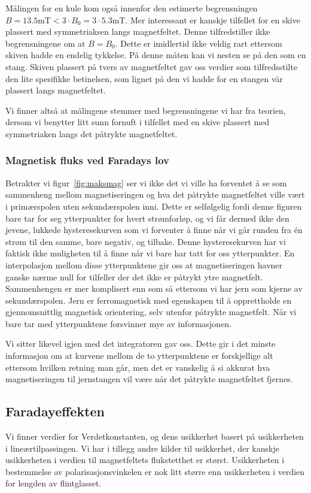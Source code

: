 \documentclass[a4paper,11pt, twocolumn]{article}
\begin{document}
Målingen for en kule kom også innenfor den estimerte begrensningen $B=13.5\text{mT}<3\cdot B_0=3\cdot 5.3$mT. Mer interessant er kanskje tilfellet for en skive plassert med symmetriaksen langs magnetfeltet. Denne tilfredstiller ikke begrensningene om at $B=B_0$. Dette er imidlertid ikke veldig rart ettersom skiven hadde en endelig tykkelse. På denne måten kan vi nesten se på den som en stang. Skiven plassert på tvers av magnetfeltet gav oss verdier som tilfredsstilte den lite spesifikke betinelsen, som lignet på den vi hadde for en stangen vår plassert langs magnetfeltet.

Vi finner altså at målingene stemmer med begrensningene vi har fra teorien, dersom vi benytter litt sunn fornuft i tilfellet med en skive plassert med symmetriaken langs det påtrykte magnetfeltet.
\subsubsection{Magnetisk fluks ved Faradays lov}
Betrakter vi figur~\ref{fig:maksmag} ser vi ikke det vi ville ha forventet å se som sammenheng mellom magnetiseringen og hva det påtrykte magnetfeltet ville vært i primærspolen uten sekundærspolen inni. Dette er selfølgelig fordi denne figuren bare tar for seg ytterpunkter for hvert strømforløp, og vi får dermed ikke den jevene, lukkede hysteresekurven som vi forventer å finne når vi går runden fra \'en strøm til den samme, bare negativ, og tilbake. Denne hysteresekurven har vi faktisk ikke muligheten til å finne når vi bare har tatt for oss ytterpunkter. En interpolasjon mellom disse ytterpunktene gir oss at magnetiseringen havner ganske nærme null for tilfeller der det ikke er påtrykt ytre magnetfelt. Sammenhengen er mer komplisert enn som så ettersom vi har jern som kjerne av sekundærspolen. Jern er ferromagnetisk med egenskapen til å opprettholde en gjennomsnittlig magnetisk orientering, selv utenfor påtrykte magnetfelt. Når vi bare tar med ytterpunktene forsvinner mye av informasjonen. 

Vi sitter likevel igjen med det integratoren gav oss. Dette gir i det minste informasjon om at kurvene mellom de to ytterpunktene er forskjellige alt ettersom hvilken retning man går, men det er vanskelig å si akkurat hva magnetiseringen til jernstangen vil være når det påtrykte magnetfeltet fjernes. 


\subsection{Faradayeffekten}
Vi finner verdier for Verdetkonstanten, og dens usikkerhet basert på usikkerheten i lineærtilpassingen. Vi har i tillegg andre kilder til usikkerhet, der kanskje usikkerheten i verdien til magnetfeltets flukstetthet er størst. Usikkerheten i bestemmelse av polarisasjonsvinkelen er nok litt større enn usikkerheten i verdien for lengden av flintglasset. 
\end{document}

